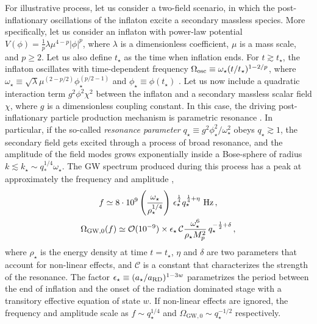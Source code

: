 \documentclass[11pt,a4paper]{article}
\begin{document}
For illustrative process, let us consider a two-field scenario, in which the post-inflationary oscillations of the inflaton excite a secondary massless species. More specifically, let us consider an inflaton with power-law potential $V(\phi) = \frac{1}{p} \lambda \mu^{4-p} |\phi|^p$, where $\lambda$ is a dimensionless coefficient, $\mu$ is a mass scale, and $p\geq 2$. Let us also define $t_{\star}$ as the time when inflation ends. For $t \gtrsim t_{\star}$, the inflaton oscillates with time-dependent frequency $\Omega_{\rm osc} \equiv \omega_{\star} (t /t_{\star})^{1- 2/p}$, where $\omega_{\star} \equiv \sqrt{\lambda} \mu^{(2 - p/2)} \phi_{\star}^{(p/2 - 1)}$ and $\phi_{\star} \equiv \phi (t_{\star})$ \cite{Turner:1983he}. Let us now include a quadratic interaction term $g^2 \phi^2 \chi^2$ between the inflaton and a secondary massless scalar field $\chi$, where $g$ is a dimensionless coupling constant. In this case, the driving post-inflationary particle production mechanism is parametric resonance \cite{Kofman:1994rk,Kofman:1997yn,Greene:1997fu}. In particular, if the so-called \textit{resonance parameter} $q_{\star} \equiv g^2 \phi_{\star}^2 /\omega_{\star}^2$ obeys $q_{\star} \gtrsim 1$, the secondary field gets excited through a process of broad resonance, and the amplitude of the field modes grows exponentially inside a Bose-sphere of radius $k \lesssim k_{\star} \sim q_*^{1/4} \omega_{\star}$. The GW spectrum produced during this process has a peak at approximately the frequency and amplitude \cite{Figueroa:2017vfa},
\begin{subequations}
    \begin{gather}
        f \simeq  8 \cdot 10^{9} \left( \frac{\omega_{\star}}{{\rho}_{\star}^{1/4}}\right)\, \epsilon_{\star}^{\frac{1}{4}} q_{\star}^{\frac{1}{4} + \eta}~{\rm Hz} \label{eq:preheating-1} \,,\\
        \Omega_{\text{GW},0}(f) \simeq \mathcal{O}(10^{-9}) \times \epsilon_{\star} \, \mathcal{C} \frac{\omega_{\star}^{6}}{\rho_{\star} M_p^{2}}\,q_{\star}^{-\frac{1}{2}+\delta} \label{eq:preheating-2} \,,
    \end{gather}
\end{subequations}
where $\rho_{\star}$ is the energy density at time $t=t_{\star}$, $\eta$ and $\delta$ are two parameters that account for non-linear effects, and $\mathcal{C}$ is a constant that characterizes the strength of the resonance. The factor $\epsilon_{\star} \equiv (a_{\star} /a_{\rm RD})^{1 - 3 w}$ parametrizes the period between the end of inflation and the onset of the radiation dominated stage with a transitory effective equation of state $w$. If non-linear effects are ignored, the frequency and amplitude scale as $f \sim q_{\star}^{1/4}$ and $\Omega_{\text{GW},0} \sim q_{\star}^{-1/2}$ respectively.
\end{document}
